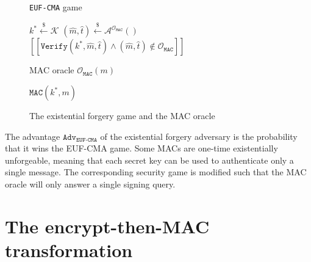\documentclass[runningheads]{llncs}
\newcommand{\mac}{\texttt{MAC}}
\newcommand{\verify}{\texttt{Verify}}
\newcommand{\leftsample}{\stackrel{\$}{\leftarrow}}
\newcommand{\llbrack}{[\![}
\newcommand{\rrbrack}{]\!]}
\newcommand{\adv}{\texttt{Adv}}
\begin{document}
\begin{figure}[H]
    \centering
    \begin{minipage}[t]{0.53\textwidth}
        \begin{algorithm}[H]
            \caption*{\texttt{EUF-CMA} game}
            \begin{algorithmic}[1]
                \State $k^\ast \leftsample \mathcal{K}$
                \State $(\hat{m}, \hat{t}) \leftsample \mathcal{A}^{\mathcal{O}_\mac}()$
                \State \Return $
                    \llbrack \verify(k^\ast, \hat{m}, \hat{t}) 
                    \land (\hat{m}, \hat{t}) \not\in \mathcal{O}_\mac
                    \rrbrack
                $
            \end{algorithmic}
        \end{algorithm}
    \end{minipage}\hspace{0.3cm}
    \begin{minipage}[t]{0.4\textwidth}
        \begin{algorithm}[H]
            \caption*{MAC oracle $\mathcal{O}_\mac(m)$}
            \begin{algorithmic}[1]
                \State \Return $\mac(k^\ast, m)$
            \end{algorithmic}
        \end{algorithm}
    \end{minipage}
    \caption{The existential forgery game and the MAC oracle}\label{fig:euf-cma-game}
\end{figure}

The advantage $\adv_\texttt{EUF-CMA}$ of the existential forgery adversary is the probability that it wins the EUF-CMA game. Some MACs are one-time existentially unforgeable, meaning that each secret key can be used to authenticate only a single message. The corresponding security game is modified such that the MAC oracle will only answer a single signing query.

\section{The encrypt-then-MAC transformation}\label{sec:the-encrypt-then-mac-transformation}
\end{document}
